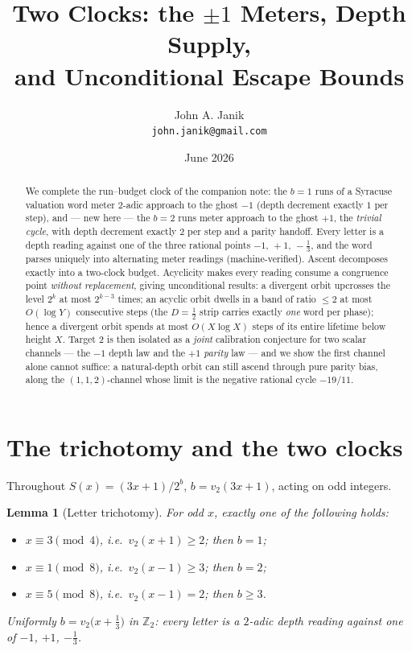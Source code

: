 \documentclass[11pt]{article}
\title{Two Clocks: the $\pm1$ Meters, Depth Supply,\\ and Unconditional Escape Bounds}
\author{John A. Janik\\ \small\texttt{john.janik@gmail.com}}
\date{June 2026}
\newtheorem{lemma}{Lemma}
\newcommand{\vt}{v_2}
\begin{document}
\maketitle

\begin{abstract}
We complete the run--budget clock of the companion note: the $b{=}1$ runs
of a Syracuse valuation word meter $2$-adic approach to the ghost $-1$
(depth decrement exactly $1$ per step), and --- new here --- the $b{=}2$
runs meter approach to the ghost $+1$, the \emph{trivial cycle}, with
depth decrement exactly $2$ per step and a parity handoff. Every letter
is a depth reading against one of the three rational points
$-1,\,+1,\,-\tfrac13$, and the word parses uniquely into alternating
meter readings (machine-verified). Ascent decomposes exactly into a
two-clock budget. Acyclicity makes every reading consume a congruence
point \emph{without replacement}, giving unconditional results: a
divergent orbit upcrosses the level $2^k$ at most $2^{k-3}$ times; an
acyclic orbit dwells in a band of ratio $\le2$ at most $O(\log Y)$
consecutive steps (the $D=\tfrac12$ strip carries exactly \emph{one}
word per phase); hence a divergent orbit spends at most $O(X\log X)$
steps of its entire lifetime below height $X$. Target 2 is then
isolated as a \emph{joint} calibration conjecture for two scalar
channels --- the $-1$ depth law and the $+1$ \emph{parity} law --- and we
show the first channel alone cannot suffice: a natural-depth orbit can
still ascend through pure parity bias, along the $(1,1,2)$-channel whose
limit is the negative rational cycle $-19/11$.
\end{abstract}

\section{The trichotomy and the two clocks}

Throughout $S(x)=(3x+1)/2^{b}$, $b=\vt(3x+1)$, acting on odd integers.

\begin{lemma}[Letter trichotomy]\label{lem:tri}
For odd $x$, exactly one of the following holds:
\begin{itemize}
\item[(i)] $x\equiv3\pmod4$, i.e.\ $\vt(x+1)\ge2$; then $b=1$;
\item[(ii)] $x\equiv1\pmod8$, i.e.\ $\vt(x-1)\ge3$; then $b=2$;
\item[(iii)] $x\equiv5\pmod8$, i.e.\ $\vt(x-1)=2$; then $b\ge3$.
\end{itemize}
Uniformly $b=\vt\bigl(x+\tfrac13\bigr)$ in $\mathbb Z_2$: every letter is
a $2$-adic depth reading against one of $-1$, $+1$, $-\tfrac13$.
\end{lemma}
\end{document}
